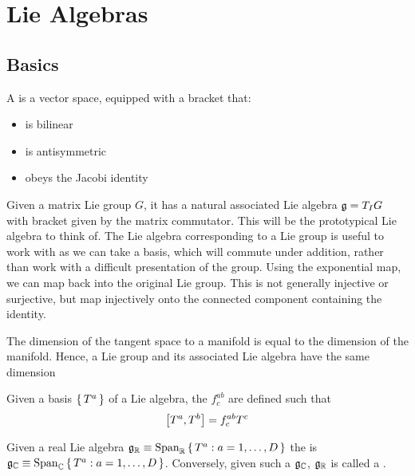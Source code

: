\documentclass{article}
\begin{document}
\section{Lie Algebras}
\subsection{Basics}

\begin{definition} 
A  is a vector space, equipped with a bracket that:
\begin{itemize}
    \item is bilinear
    \item is antisymmetric
    \item obeys the Jacobi identity
\end{itemize}
\end{definition}

\begin{idea}
Given a matrix Lie group $G$, it has a natural associated Lie algebra $\mf{g}=T_{I}G$ with bracket given by the matrix commutator. This will be the prototypical Lie algebra to think of. The Lie algebra corresponding to a Lie group is useful to work with as we can take a basis, which will commute under addition, rather than work with a difficult presentation of the group.
Using the exponential map, we can map back into the original Lie group. This is not generally injective or surjective, but map injectively onto the connected component containing the identity. 
\end{idea}

\begin{fact}
The dimension of the tangent space to a manifold is equal to the dimension of the manifold. Hence, a Lie group and its associated Lie algebra have the same dimension
\end{fact}

\begin{definition}
Given a basis $\set{T^a}$ of a Lie algebra, the  $f^{ab}_c$ are defined such that 
\[
\comm[T^a]{T^b}=f^{ab}_c T^c
\]
\end{definition}

\begin{definition}
Given a  real Lie algebra $\mf{g}_\mathbb{R}\equiv\spn_{\mathbb{R}}\set{ T^a : a=1, \dots, D }$ the 
is $\mf{g}_\mathbb{C}\equiv\spn_{\mathbb{C}}\set{ T^a : a=1, \dots, D }$. Conversely, given such a $\mf{g}_\mathbb{C}$, $\mf{g}_\mathbb{R}$ is called a .  
\end{definition}
\end{document}
